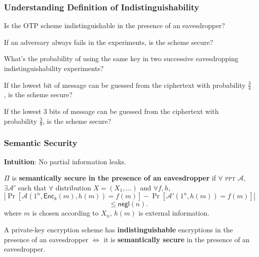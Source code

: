 \begin{frame}\frametitle{Understanding Definition of Indistinguishability}
\begin{exampleblock}{Is the OTP scheme indistinguishable in the presence of an eavesdropper?}
\end{exampleblock}
\begin{exampleblock}{If an adversary always fails in the experiments, is the scheme secure?}
\end{exampleblock}
\begin{exampleblock}{What's the probability of using the same key in two successive eavesdropping indistinguishability experiments?}
\end{exampleblock}
\begin{exampleblock}{If the lowest bit of message can be guessed from the ciphertext with probability $\frac{3}{4}$, is the scheme secure?}
\end{exampleblock}
\begin{exampleblock}{If the lowest 3 bits of message can be guessed from the ciphertext with probability $\frac{3}{8}$, is the scheme secure?}
\end{exampleblock}
\end{frame}
\begin{frame}\frametitle{Semantic Security}
\textbf{Intuition}: No partial information leaks.
\begin{definition}
$\Pi$ is \textbf{semantically secure in the presence of an eavesdropper} if $\forall$ \textsc{ppt} $\mathcal{A}$, $\exists \mathcal{A'}$ such that $\forall$ distribution $X = (X_1, \dots)$ and $\forall f, h$,
\[ \left|\Pr[\mathcal{A}(1^n,\mathsf{Enc}_k(m),h(m))=f(m)]-\Pr[\mathcal{A}'(1^n,h(m))=f(m)]\right| 
\]
\[ \le \mathsf{negl}(n).
\]
where $m$ is chosen according to $X_n$, $h(m)$ is external information.
\end{definition}
\begin{theorem}
A private-key encryption scheme has \textbf{indistinguishable} encryptions in the presence of an eavesdropper $\iff$ it is \textbf{semantically secure} in the presence of an eavesdropper.
\end{theorem}
\end{frame}
